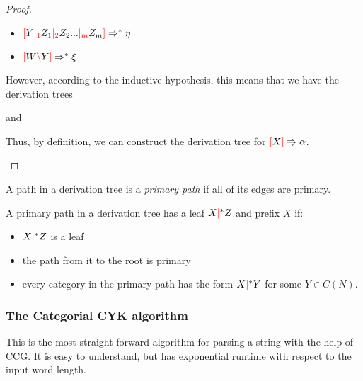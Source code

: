 \documentclass[main.tex]{subfiles}
\begin{document}
\begin{proof}
\begin{itemize}
\begin{itemize}
                \item $\textcolor{red}{[} Y \textcolor{red}{|_{1}} Z_1 \textcolor{red}{|_{2}} Z_2 ... \textcolor{red}{|_{m}} Z_m \textcolor{red}{]} \Rightarrow^* \eta$
                \item $\textcolor{red}{[} W \textcolor{red}{\backslash} Y \textcolor{red}{]} \Rightarrow^* \xi$
            \end{itemize}
            However, according to the inductive hypothesis, this means that we
            have the derivation trees
            \begin{center}
                and
            \end{center}
            Thus, by definition, we can construct the derivation tree
            for $\textcolor{red}{[} X \textcolor{red}{]} \Rrightarrow \alpha$.
    \end{itemize}
\end{proof}

\begin{defn}
    A path in a derivation tree is a \emph{primary path} if all of its edges
    are primary.
\end{defn}

\begin{defn}
    A primary path in a derivation tree has a leaf $X \textcolor{red}{|}^* Z$ and prefix $X$
    if:
    \begin{itemize}
        \item $X \textcolor{red}{|}^* Z$ is a leaf
        \item the path from it to the root is primary
        \item every category in the primary path has the form $X \textcolor{red}{|}^* Y$
            for some $Y \in C(N)$.
    \end{itemize}
\end{defn}

\subsubsection{The Categorial CYK algorithm}

This is the most straight-forward algorithm for parsing a string with the help
of CCG. It is easy to understand, but has exponential runtime with respect to
the input word length.
\end{document}
